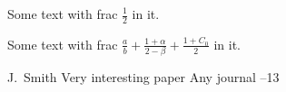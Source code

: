 \documentclass{article}
\begin{document}

\author{Author's Name}

Some text with frac $\frac{1}{2}$ in it.

Some text with frac $\frac{a}{b}+\frac{1+\alpha}{2-\beta}+\frac{1+C_0}{2}$ in it.

\begin{thebibliography}{99}


\by J.~Smith
\paper Very interesting paper
\jour Any journal
--13


\end{thebibliography}
\end{document}
